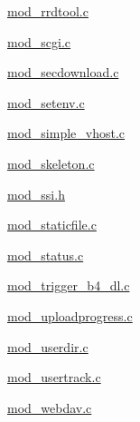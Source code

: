 \begin{DoxyCompactItemize}
\hyperlink{mod__rrdtool_8c}{mod\-\_\-rrdtool.\-c}\item 
\hyperlink{mod__scgi_8c}{mod\-\_\-scgi.\-c}\item 
\hyperlink{mod__secdownload_8c}{mod\-\_\-secdownload.\-c}\item 
\hyperlink{mod__setenv_8c}{mod\-\_\-setenv.\-c}\item 
\hyperlink{mod__simple__vhost_8c}{mod\-\_\-simple\-\_\-vhost.\-c}\item 
\hyperlink{mod__skeleton_8c}{mod\-\_\-skeleton.\-c}\item 
\hyperlink{mod__ssi_8h}{mod\-\_\-ssi.\-h}\item 
\hyperlink{mod__staticfile_8c}{mod\-\_\-staticfile.\-c}\item 
\hyperlink{mod__status_8c}{mod\-\_\-status.\-c}\item 
\hyperlink{mod__trigger__b4__dl_8c}{mod\-\_\-trigger\-\_\-b4\-\_\-dl.\-c}\item 
\hyperlink{mod__uploadprogress_8c}{mod\-\_\-uploadprogress.\-c}\item 
\hyperlink{mod__userdir_8c}{mod\-\_\-userdir.\-c}\item 
\hyperlink{mod__usertrack_8c}{mod\-\_\-usertrack.\-c}\item 
\hyperlink{mod__webdav_8c}{mod\-\_\-webdav.\-c}\end{DoxyCompactItemize}
